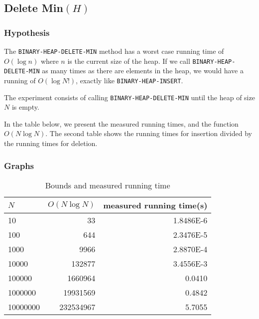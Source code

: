 \documentclass[a4paper,oneside,11pt]{article}
\begin{document}
\subsection*{Delete Min$(H)$}
\subsubsection*{Hypothesis}
The \texttt{BINARY-HEAP-DELETE-MIN} method has a worst case running time of $O(\log n)$ where $n$ is the current size of the heap. If we call \texttt{BINARY-HEAP-DELETE-MIN} as many times as there are elements in the heap, we would have a running of $O(\log N!)$, exactly like \texttt{BINARY-HEAP-INSERT}.

The experiment consists of calling \texttt{BINARY-HEAP-DELETE-MIN} until the heap of size $N$ is empty.

In the table below, we present the measured running times, and the function $O(N\log N)$. The second table shows the running times for insertion divided by the running times for deletion.
\subsubsection*{Graphs}
\begin{table}
  \begin{center}
    \begin{tabular}{l|r|r}
      $N$ & $O(N\log N)$ & measured running time(s)\\
      \hline
      10       & 33         & \num{1.8486E-6}\\
      100      & 644        & \num{2.3476E-5}\\
      1000     & 9966       & \num{2.8870E-4}\\
      10000    & 132877     & \num{3.4556E-3}\\
      100000   & 1660964    & \num{0.0410}\\
      1000000  & 19931569   & \num{0.4842}\\
      10000000 & 232534967  & \num{5.7055}
    \end{tabular}
    \caption{Bounds and measured running time}
  \end{center}
\end{table}
\end{document}
